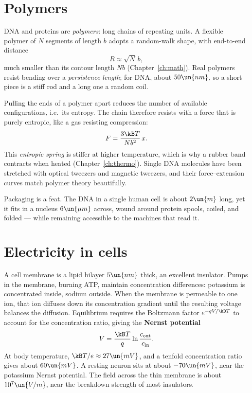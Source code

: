\section{Polymers}

DNA and proteins are \emph{polymers}: long chains of repeating units. A flexible polymer of $N$ segments of length $b$ adopts a random-walk shape, with end-to-end distance
\[
  R\approx\sqrt N\,b,
\]
much smaller than its contour length $Nb$ (Chapter~\ref{ch:math}). Real polymers resist bending over a \emph{persistence length}; for DNA, about $50\un{nm}$, so a short piece is a stiff rod and a long one a random coil.

Pulling the ends of a polymer apart reduces the number of available configurations, i.e.\ its entropy. The chain therefore resists with a force that is purely entropic, like a gas resisting compression:
\[
  F = \frac{3\kB T}{Nb^2}\,x .
\]
This \emph{entropic spring} is stiffer at higher temperature, which is why a rubber band contracts when heated (Chapter~\ref{ch:thermo}). Single DNA molecules have been stretched with optical tweezers and magnetic tweezers, and their force--extension curves match polymer theory beautifully.

Packaging is a feat. The DNA in a single human cell is about $2\un{m}$ long, yet it fits in a nucleus $6\un{\mu m}$ across, wound around protein spools, coiled, and folded --- while remaining accessible to the machines that read it.

\section{Electricity in cells}

A cell membrane is a lipid bilayer $5\un{nm}$ thick, an excellent insulator. Pumps in the membrane, burning ATP, maintain concentration differences: potassium is concentrated inside, sodium outside. When the membrane is permeable to one ion, that ion diffuses down its concentration gradient until the resulting voltage balances the diffusion. Equilibrium requires the Boltzmann factor $e^{-qV/\kB T}$ to account for the concentration ratio, giving the \textbf{Nernst potential}
\[
  V = \frac{\kB T}{q}\ln\frac{c_{\text{out}}}{c_{\text{in}}}.
\]
At body temperature, $\kB T/e\approx27\un{mV}$, and a tenfold concentration ratio gives about $60\un{mV}$. A resting neuron sits at about $-70\un{mV}$, near the potassium Nernst potential. The field across the thin membrane is about $10^7\un{V/m}$, near the breakdown strength of most insulators.


